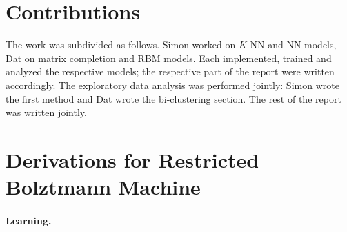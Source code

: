 \documentclass[bj, preprint]{imsart}
\begin{document}
\section{Contributions}\label{sec:contrib}

The work was subdivided as follows. Simon worked on $K$-NN and NN models, Dat on matrix completion and RBM models. Each implemented, trained and analyzed the respective models; the respective part of the report were written accordingly. The exploratory data analysis was performed jointly: Simon wrote the first method and Dat wrote the bi-clustering section. The rest of the report was written jointly.

\section{Derivations for Restricted Bolztmann Machine}\label{sec:rbm}

\paragraph{Learning.}\label{par:method.models.rbm.learning}
\end{document}

